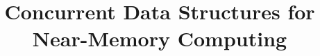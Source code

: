 \documentclass{sig-alternate-05-2015}
\title{Concurrent Data Structures for Near-Memory Computing}
\author{}
\date{}							%
\begin{document}
\maketitle



\newpage
\ 
\newpage








%







\begin{comment}
\appendix

\section{Parallelism of memory accesses}
If the distribution of requests to the PIM-managed skip-list is very sharp, that is,
a lot of requests hit a small range of keys, we may have to rebalance the skip-list too often,
incurring significant performance overhead.
However, if we don't rebalance the skip-list frequently,
a large number of requests may be sent one PIM core, which becomes the performance bottleneck.
On the other hand, even existing concurrent skip-list algorithms in which threads execute
their operations by themselves in parallel cannot have good performance either,
since concurrent updates (i.e., add() and delete()) within a small range conflict with one another.
Thus, we believe a PIM-managed skip-list can achieve competitive throughput if each PIM core can
execute multiple read-only requests (i.e., contains()) and at most one update request efficiently.
We have assumed each PIM core can only deal with one request at a time,
but in fact it has the potential to execute multiple requests in parallel.

Hsieh et al. \cite{hsieh2016accelerating} proposed how to design a PIM core that
can make multiple memory accesses for multiple pointer-chasing based requests in parallel.
The idea is that, after requiring a memory access for an operation request A,
it can immediately retrieve another request B without waiting for the data of the memory access for A.
The PIM core will later resume A once the data of the memory access is returned.
In other words, the PIM core can hide its memory access latency by making multiple accesses
in multiple requests in parallel.
In theory, if the sum of the latency of doing the computation between two memory accesses
for a pointer-chasing based request and the latency of switching from one request to another
is only $1/k$ of the latency of a memory access by the PIM core,
the PIM core can essentially execute $k$ requests in parallel without delaying the pointer-chasing
procedure of each request (see \cite{hsieh2016accelerating} for more details).
Those requests can therefore be thought of as requests executed in parallel
by different hardware threads of the PIM core.


\end{comment}
\end{document}
